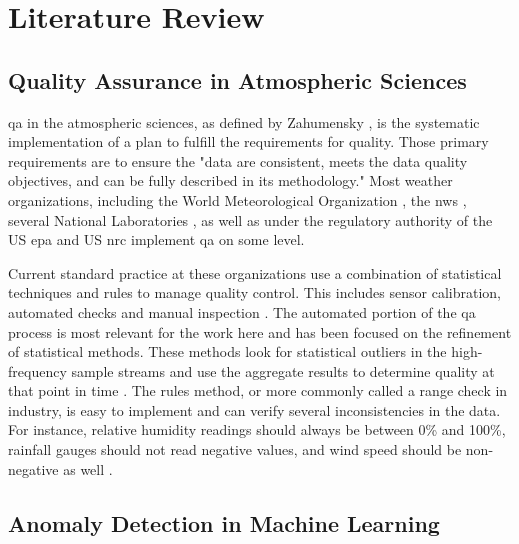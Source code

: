 \section{Literature Review}
\label{sec:literature_review}
\subsection{Quality Assurance in Atmospheric Sciences}

\acrlong{qa} in the atmospheric sciences, as defined by Zahumensky \cite{zahumenskyGuidelinesQualityControl2004}, is the systematic implementation of a plan to fulfill the requirements for quality.  Those primary requirements are to ensure the "data are consistent, meets the data quality objectives, and can be fully described in its methodology."  Most weather organizations, including the World Meteorological Organization \cite{zahumenskyGuidelinesQualityControl2004}, the \gls{nws}  \cite{northropQUALITYASSURANCEPROGRAM2019}, several National Laboratories \cite{SRNLTR202000197Pdf}, as well as under the regulatory authority of the US \gls{epa} \cite{ElectronicCodeFederal} and US \gls{nrc} \cite{ML070630021Pdf} implement \gls{qa} on some level.

Current standard practice at these organizations use a combination of statistical techniques and rules to manage quality control.  This includes sensor calibration, automated checks and manual inspection \cite{graybealComplexQualityAssurance2004}.  The automated portion of the \gls{qa} process is most relevant for the work here and has been focused on the refinement of statistical methods.  These methods look for statistical outliers in the high-frequency sample streams and use the aggregate results to determine quality at that point in time \cite{campbellQuantityNothingQuality2013}.  The rules method, or more commonly called a range check in industry, is easy to implement and can verify several inconsistencies in the data.  For instance, relative humidity readings should always be between 0\% and 100\%, rainfall gauges should not read negative values, and wind speed should be non-negative as well \cite{hillakerDailyClimateData2009} \cite{fiebrichQualityAssuranceProcedures2010}.

\subsection{Anomaly Detection in Machine Learning}

